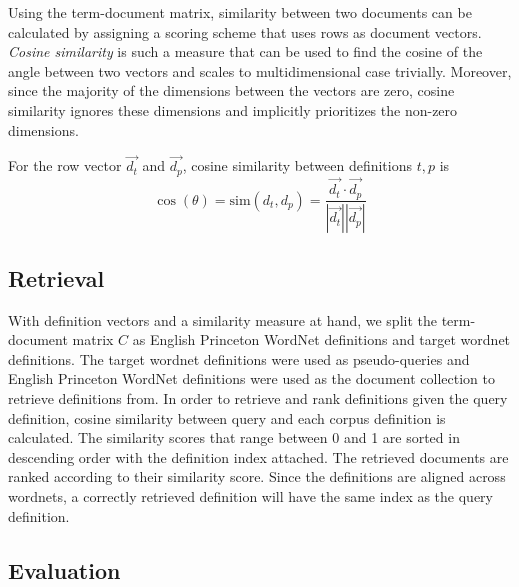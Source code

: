 Using the term-document matrix, similarity between two documents can be calculated by assigning a scoring scheme that uses rows as document vectors.
\emph{Cosine similarity} is such a measure that can be used to find the cosine of the angle between two vectors and scales to multidimensional case trivially.
Moreover, since the majority of the dimensions between the vectors are zero, cosine similarity ignores these dimensions and implicitly prioritizes the non-zero dimensions.

For the row vector $\vec{d_t}$ and $\vec{d_p}$, cosine similarity between definitions $t, p$ is
\begin{equation}
    \cos(\theta) = \text{sim}(d_t, d_p) = \frac{\vec{d_t} \cdot \vec{d_p}}{|\vec{d_t}||\vec{d_p}|}
\end{equation}

\subsection{Retrieval}%
\label{sub:retrieval}

With definition vectors and a similarity measure at hand, we split the term-document matrix $C$ as English Princeton WordNet definitions and target wordnet definitions.
The target wordnet definitions were used as pseudo-queries and English Princeton WordNet definitions were used as the document collection to retrieve definitions from.
In order to retrieve and rank definitions given the query definition, cosine similarity between query and each corpus definition is calculated.
The similarity scores that range between 0 and 1 are sorted in descending order with the definition index attached.
The retrieved documents are ranked according to their similarity score.
Since the definitions are aligned across wordnets, a correctly retrieved definition will have the same index as the query definition.

\subsection{Evaluation}%
\label{sub:evaluation}


